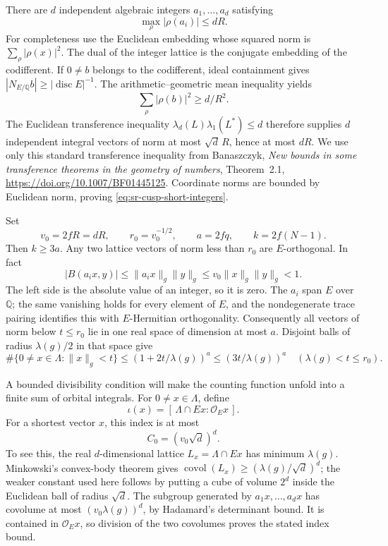 There are \(d\) independent algebraic integers
\(a_1,\dots,a_d\) satisfying
\begin{equation}\label{eq:sr-cusp-short-integers}
                 \max_\rho|\rho(a_i)|\le dR .
\end{equation}
For completeness use the Euclidean embedding whose squared norm is
\(\sum_\rho|\rho(x)|^2\).
The dual of the integer lattice is the conjugate embedding of the
codifferent.  If \(0\ne b\) belongs to the codifferent, ideal
containment gives
\(|N_{E/\mathbb Q}b|\ge|\operatorname{disc}E|^{-1}\).
The arithmetic--geometric mean inequality yields
\[
                  \sum_\rho|\rho(b)|^2\ge d/R^2 .
\]
The Euclidean transference inequality
\(\lambda_d(L)\lambda_1(L^*)\le d\)
therefore supplies \(d\) independent integral vectors of norm
at most \(\sqrt d\,R\), hence at most \(dR\).
We use only this standard transference inequality from
Banaszczyk, \emph{New bounds in some transference theorems in
the geometry of numbers}, Theorem~2.1,
\url{https://doi.org/10.1007/BF01445125}.
Coordinate norms are bounded by Euclidean norm, proving
\eqref{eq:sr-cusp-short-integers}.

Set
\[
                 v_0=2fR=dR,\qquad r_0=v_0^{-1/2},
 \qquad a=2fq,\qquad k=2f(N-1).
\]
Then \(k\ge3a\).
Any two lattice vectors of norm less than \(r_0\) are
\(E\)-orthogonal.  In fact
\[
 |B(a_i x,y)|\le
              \|a_i x\|_g\|y\|_g
          \le v_0\|x\|_g\|y\|_g<1 .
\]
The left side is the absolute value of an integer, so it is zero.
The \(a_i\) span \(E\) over \(\mathbb Q\); the same vanishing holds
for every element of \(E\), and the nondegenerate trace pairing
identifies this with \(E\)-Hermitian orthogonality.
Consequently all vectors of norm below \(t\le r_0\) lie in one
real space of dimension at most \(a\).
Disjoint balls of radius \(\lambda(g)/2\) in that space give
\begin{equation}\label{eq:sr-cusp-packing}
 \#\{0\ne x\in\Lambda:\|x\|_g<t\}
       \le(1+2t/\lambda(g))^a
       \le(3t/\lambda(g))^a
                   \quad(\lambda(g)<t\le r_0).
\end{equation}

A bounded divisibility condition will make the counting function
unfold into a finite sum of orbital integrals.
For \(0\ne x\in\Lambda\), define
\[
                \iota(x)=
          [\,\Lambda\cap Ex:\mathcal O_Ex\,].
\]
For a shortest vector \(x\), this index is at most
\[
                    C_0=(v_0\sqrt d)^d .
\]
To see this, the real \(d\)-dimensional lattice
\(L_x=\Lambda\cap Ex\) has minimum \(\lambda(g)\).
Minkowski's convex-body theorem gives
\(\operatorname{covol}(L_x)\ge
(\lambda(g)/\sqrt d)^d\); the weaker constant used here follows
by putting a cube of volume \(2^d\) inside the Euclidean ball
of radius \(\sqrt d\).
The subgroup generated by \(a_1x,\dots,a_dx\) has covolume
at most \((v_0\lambda(g))^d\), by Hadamard's determinant bound.
It is contained in \(\mathcal O_Ex\), so division of the two
covolumes proves the stated index bound.

